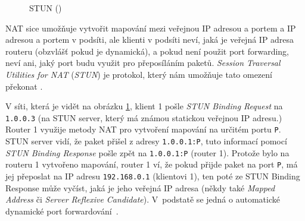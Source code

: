\begin{figure}[H]
	\centering
	\caption{STUN (\publicPrivateIP)}
	\label{stun}
\end{figure}

NAT sice umožňuje vytvořit mapování mezi veřejnou IP adresou a portem a IP
adresou a portem v podsíti, ale klienti v podsíti neví, jaká je veřejná IP
adresa routeru (obzvlášť pokud je dynamická), a pokud není použit port
forwarding, neví ani, jaký port budu využit pro přeposíláním paketů.
\textit{Session Traversal Utilities for NAT} (\textit{STUN}) je protokol, který
nám umožňuje tato omezení překonat \cite{WebRTCForTheCurious}.

V síti, která je vidět na obrázku \ref{stun}, klient 1 pošle \textit{STUN
Binding Request} na \texttt{1.0.0.3} (na STUN server, který má známou
statickou veřejnou IP adresu.) Router 1 využije metody NAT pro vytvoření
mapování na určitém portu \texttt{P}. STUN server vidí, že paket
přišel z adresy \texttt{1.0.0.1:P}, tuto informací pomocí \textit{STUN
Binding Response} pošle zpět na \texttt{1.0.0.1:P} (router 1). Protože
bylo na routeru 1 vytvořeno mapování, router 1 ví, že pokud přijde paket na port
\texttt{P}, má jej přeposlat na IP adresu
\texttt{192.168.0.1} (klientovi 1), ten poté ze STUN Binding Response
může vyčíst, jaká je jeho veřejná IP adresa  (někdy také \textit{Mapped Address}
či \textit{Server Reflexive Candidate}). V~podstatě se jedná o automatické
dynamické port forwardování~\cite{WebRTCForTheCurious}.

